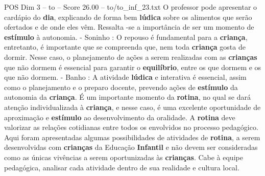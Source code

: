 \begin{textsample}{POS Dim 3 – to – Score 26.00 – to/to\_inf\_23.txt}
O professor pode apresentar o cardápio do \textbf{dia}, explicando de forma bem \textbf{lúdica} sobre os alimentos que serão ofertados e de onde eles vêm.
Ressalta -se a importância de ser um momento de \textbf{estímulo} à autonomia. - Soninho : O repouso é fundamental para a \textbf{criança}, entretanto, é importante que se compreenda que, nem toda \textbf{criança} gosta de dormir.
Nesse caso, o planejamento de ações a serem realizadas com as \textbf{crianças} que não dormem é essencial para garantir o \textbf{equilíbrio}, entre os que dormem e os que não dormem. - Banho : A atividade \textbf{lúdica} e interativa é essencial, assim como o planejamento e o preparo docente, prevendo ações de \textbf{estímulo} da autonomia da \textbf{criança}.
É um importante momento da \textbf{rotina}, no qual se dará atenção individualizada à \textbf{criança}, e nesse caso, é uma excelente oportunidade de aproximação e \textbf{estímulo} ao desenvolvimento da oralidade.
A \textbf{rotina} deve valorizar as relações cotidianas entre todos os envolvidos no processo pedagógico.
Aqui foram apresentadas algumas possibilidades de atividades de \textbf{rotina}, a serem desenvolvidas com \textbf{crianças} da Educação \textbf{Infantil} e não devem ser consideradas como as únicas vivências a serem oportunizadas às \textbf{crianças}.
Cabe à equipe pedagógica, analisar cada atividade dentro de sua realidade e cultura local.

\end{textsample}
